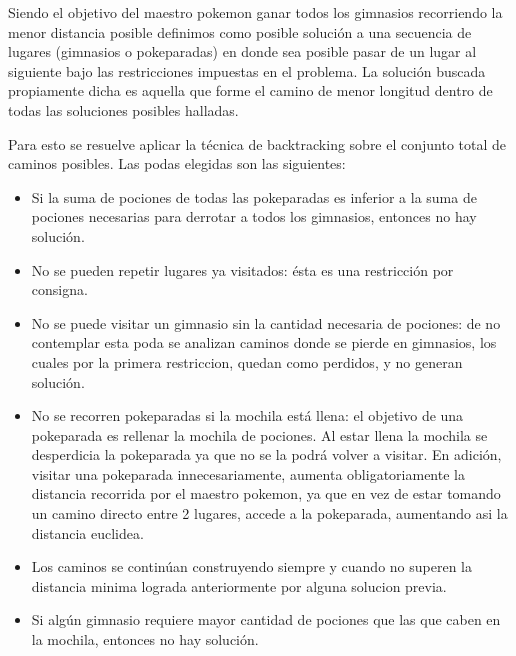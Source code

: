 Siendo el objetivo del maestro pokemon ganar todos los gimnasios recorriendo la menor distancia posible definimos como posible solución a una secuencia de lugares (gimnasios o pokeparadas) en donde sea posible pasar de un lugar al siguiente bajo las restricciones impuestas en el problema. La solución buscada propiamente dicha es aquella que forme el camino de menor longitud dentro de todas las soluciones posibles halladas.

Para esto se resuelve aplicar la técnica de backtracking sobre el conjunto total de caminos posibles. Las podas elegidas son las siguientes:

\begin{itemize}
\item Si la suma de pociones de todas las pokeparadas es inferior a la suma de pociones necesarias para derrotar a todos los gimnasios, entonces no hay solución.
\item No se pueden repetir lugares ya visitados: ésta es una restricción por consigna.
\item No se puede visitar un gimnasio sin la cantidad necesaria de pociones: de no contemplar esta poda se analizan caminos donde se pierde en gimnasios, los cuales por la primera restriccion, quedan como perdidos, y no generan solución.
\item No se recorren pokeparadas si la mochila está llena: el objetivo de una pokeparada es rellenar la mochila de pociones. Al estar llena la mochila se desperdicia la pokeparada ya que no se la podrá volver a visitar. En adición, visitar una pokeparada innecesariamente, aumenta obligatoriamente la distancia recorrida por el maestro pokemon, ya que en vez de estar tomando un camino directo entre 2 lugares, accede a la pokeparada, aumentando asi la distancia euclidea.
\item Los caminos se continúan construyendo siempre y cuando no superen la distancia minima lograda anteriormente por alguna solucion previa.
\item Si algún gimnasio requiere mayor cantidad de pociones que las que caben en la mochila, entonces no hay solución. 


\end{itemize}